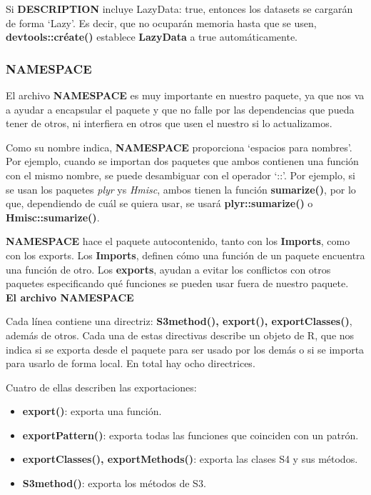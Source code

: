 Si \textbf{DESCRIPTION} incluye LazyData: true, entonces los datasets se cargar\'an de forma
\enquote*{Lazy}. Es decir, que no ocupar\'an memoria hasta que se usen, \textbf{devtools::cr\'eate()} establece
\textbf{LazyData} a true autom\'aticamente.

\subsubsection{NAMESPACE}

El archivo \textbf{NAMESPACE} es muy importante en nuestro paquete, ya que nos va a ayudar a
encapsular el paquete y que no falle por las dependencias que pueda tener de otros, ni
interfiera en otros que usen el nuestro si lo actualizamos.

Como su nombre indica, \textbf{NAMESPACE} proporciona \enquote*{espacios para nombres}. Por ejemplo,
cuando se importan dos paquetes que ambos contienen una funci\'on con el mismo nombre,
se puede desambiguar con el operador \enquote*{::}. Por ejemplo, si se usan los paquetes \textit{plyr} ys
\textit{Hmisc}, ambos tienen la funci\'on \textbf{sumarize()}, por lo que, dependiendo de cu\'al se quiera usar,
se usar\'a \textbf{plyr::sumarize()} o \textbf{Hmisc::sumarize()}.

\textbf{NAMESPACE} hace el paquete autocontenido, tanto con los \textbf{Imports}, como con los
exports. Los \textbf{Imports}, definen c\'omo una funci\'on de un paquete encuentra una funci\'on de
otro. Los \textbf{exports}, ayudan a evitar los conflictos con otros paquetes especificando qu\'e
funciones se pueden usar fuera de nuestro paquete.\\

\textbf{El archivo NAMESPACE}

Cada l\'inea contiene una directriz: \textbf{S3method(), export(), exportClasses()}, adem\'as de otros.
Cada una de estas directivas describe un objeto de R, que nos indica si se exporta desde
el paquete para ser usado por los dem\'as o si se importa para usarlo de forma local.
En total hay ocho directrices. 

Cuatro de ellas describen las exportaciones:

\begin{itemize}
    \item \textbf{ export()}: exporta una funci\'on.
    \item \textbf{ exportPattern()}: exporta todas las funciones que coinciden con un patr\'on.
    \item \textbf{ exportClasses(), exportMethods()}: exporta las clases S4 y sus m\'etodos.
    \item \textbf{ S3method()}: exporta los m\'etodos de S3.
\end{itemize}

